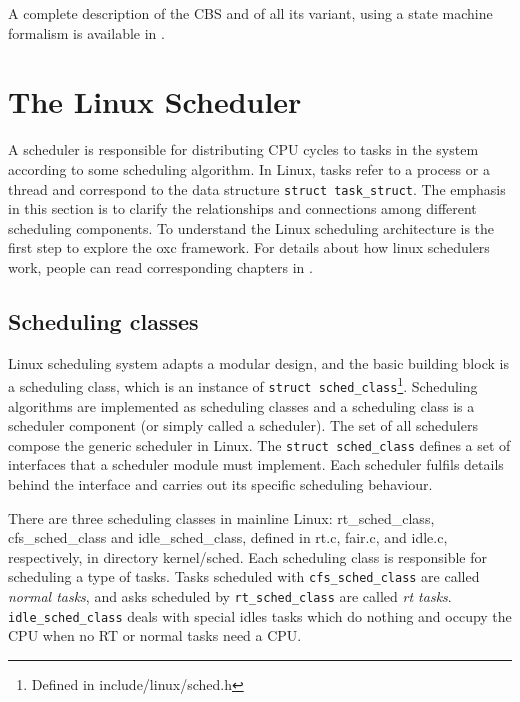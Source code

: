 A complete description of the CBS and of all its variant, using a
state machine formalism is available in
\cite{DBLP:journals/rts/MancinaFLHGT09}.

%
%

\section{The Linux Scheduler\label{sec:LinuxSched}}

A scheduler is responsible for distributing CPU cycles to tasks in the
system according to some scheduling algorithm. In Linux, tasks refer
to a process or a thread and correspond to the data structure
\texttt{struct task\_struct}. The emphasis in this section is to
clarify the relationships and connections among different scheduling
components. %
To understand the Linux scheduling architecture is the
first step to explore the oxc framework. For details about how linux
schedulers work, people can read corresponding chapters in \cite{Wolf}
\cite{R.Love}.

\subsection{Scheduling classes\label{sec:LinuxSched_classes}}

Linux scheduling system adapts a modular design, and the basic
building block is a scheduling class, which is an instance of
\texttt{struct sched\_class}\footnote{Defined in
  include/linux/sched.h}. Scheduling algorithms are implemented as
scheduling classes and a scheduling class is a scheduler component (or
simply called a scheduler). The set of all schedulers compose the
generic scheduler in Linux.  The \texttt{struct sched\_class} defines
a set of interfaces that a scheduler module must implement. Each
scheduler fulfils details behind the interface and carries out its
specific scheduling behaviour.

There are three scheduling classes in mainline Linux:
rt\_sched\_class, cfs\_sched\_class and idle\_sched\_class, defined in
rt.c, fair.c, and idle.c, respectively, in directory
kernel/sched. Each scheduling class is responsible for scheduling a
type of tasks. Tasks scheduled with \texttt{cfs\_sched\_class} are
called \emph{normal tasks}, and asks scheduled by
\texttt{rt\_sched\_class} are called \emph{rt tasks}.
\texttt{idle\_sched\_class} deals with special idles tasks which do
nothing and occupy the CPU when no RT or normal tasks need a CPU.

